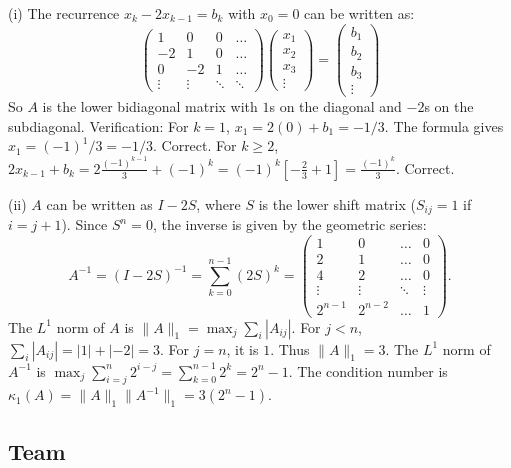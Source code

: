 \begin{solution}
(i) The recurrence $x_k - 2x_{k-1} = b_k$ with $x_0=0$ can be written as:
\[
\begin{pmatrix} 
1 & 0 & 0 & \dots \\
-2 & 1 & 0 & \dots \\
0 & -2 & 1 & \dots \\
\vdots & \vdots & \ddots & \ddots
\end{pmatrix}
\begin{pmatrix} x_1 \\ x_2 \\ x_3 \\ \vdots \end{pmatrix}
=
\begin{pmatrix} b_1 \\ b_2 \\ b_3 \\ \vdots \end{pmatrix}
\]
So $A$ is the lower bidiagonal matrix with $1$s on the diagonal and $-2$s on the subdiagonal.
Verification: For $k=1$, $x_1 = 2(0) + b_1 = -1/3$. The formula gives $x_1 = (-1)^1/3 = -1/3$. Correct.
For $k \geq 2$, $2x_{k-1} + b_k = 2 \frac{(-1)^{k-1}}{3} + (-1)^k = (-1)^k [ -\frac{2}{3} + 1 ] = \frac{(-1)^k}{3}$. Correct.

(ii) $A$ can be written as $I - 2S$, where $S$ is the lower shift matrix ($S_{ij}=1$ if $i=j+1$). Since $S^n=0$, the inverse is given by the geometric series:
\[
A^{-1} = (I - 2S)^{-1} = \sum_{k=0}^{n-1} (2S)^k = \begin{pmatrix} 
1 & 0 & \dots & 0 \\
2 & 1 & \dots & 0 \\
4 & 2 & \dots & 0 \\
\vdots & \vdots & \ddots & \vdots \\
2^{n-1} & 2^{n-2} & \dots & 1
\end{pmatrix}.
\]
The $L^1$ norm of $A$ is $\|A\|_1 = \max_{j} \sum_i |A_{ij}|$. For $j < n$, $\sum_i |A_{ij}| = |1| + |-2| = 3$. For $j=n$, it is $1$. Thus $\|A\|_1 = 3$.
The $L^1$ norm of $A^{-1}$ is $\max_j \sum_{i=j}^n 2^{i-j} = \sum_{k=0}^{n-1} 2^k = 2^n - 1$.
The condition number is $\kappa_1(A) = \|A\|_1 \|A^{-1}\|_1 = 3(2^n - 1)$.
\end{solution}

\subsection{Team}

